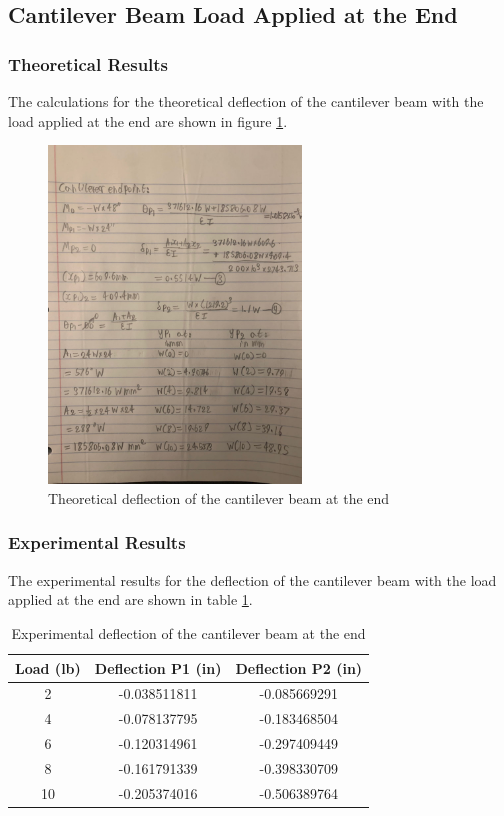 \documentclass[12pt, titlepage]{article}
\begin{document}
\subsection{Cantilever Beam Load Applied at the End}
\subsubsection{Theoretical Results}
The calculations for the theoretical deflection of the cantilever beam with the
load applied at the end are shown in figure \ref{fig:TheoreticalCantileverBeamEnd}.
\begin{figure}[H]
    \centering
    \includegraphics[width=0.6\textwidth]{./Images/C_E.jpeg}
    \caption{Theoretical deflection of the cantilever beam at the end}
    \label{fig:TheoreticalCantileverBeamEnd}
\end{figure}
\newpage
\subsubsection{Experimental Results}
The experimental results for the deflection of the cantilever beam with the
load applied at the end are shown in table \ref{tab:ExperimentalCantileverBeamEnd}.
\begin{table}[H]
    \centering
    \caption{Experimental deflection of the cantilever beam at the end}
    \label{tab:ExperimentalCantileverBeamEnd}
    \begin{tabular}{|c|c|c|}
        \hline
        \textbf{Load (lb)} & \textbf{Deflection P1 (in)} & \textbf{Deflection P2 (in)}\\
        \hline
        2 & -0.038511811 & -0.085669291 \\
        \hline
        4 & -0.078137795 & -0.183468504 \\
        \hline
        6 & -0.120314961 & -0.297409449 \\
        \hline
        8 & -0.161791339 & -0.398330709 \\
        \hline
        10 & -0.205374016 & -0.506389764 \\
        \hline
    \end{tabular}
\end{table}
\end{document}
